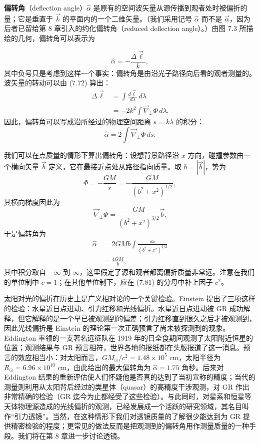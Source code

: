 \textbf{偏转角}（deflection angle）$\widehat{\alpha}$ 是原有的空间波矢量从源传播到观者处时被偏折的量；它是垂直于 $\vec{k}$ 的平面内的一个二维矢量。（我们采用记号 $\widehat{\alpha}$ 而不是 $\vec{\alpha}$，因为后者已留给第 8 章引入的约化偏转角（reduced deflection angle）。）由图 7.3 所描绘的几何，偏转角可以表示为


\begin{equation*}
\widehat{\alpha} = -\frac{\Delta\vec{\ell}}{k},
\tag{7.76}
\end{equation*}
其中负号只是考虑到这样一个事实：偏转角是由沿光子路径向后看的观者测量的。波矢量的转动可以由 (7.72) 算出：
\begin{align*}
\Delta\vec{\ell} &= \int\frac{d\vec{\ell}}{d\lambda}\, d\lambda \\
&= -2k^2\int \vec{\nabla}_{\perp}\Phi\, d\lambda.
\tag{7.77}
\end{align*}
因此，偏转角可以写成沿所经过的物理空间距离 $s = k\lambda$ 的积分：
\begin{equation*}
\boxed{\,\widehat{\alpha} = 2\int \vec{\nabla}_{\perp}\Phi\, ds.\,}
\tag{7.78}
\end{equation*}

我们可以在点质量的情形下算出偏转角：设想背景路径沿 $x$ 方向，碰撞参数由一个横向矢量 $\vec{b}$ 定义，它在最接近点处从路径指向质量。取 $b = |\vec{b}|$，势为
\begin{equation*}
\Phi = -\frac{GM}{r} = -\frac{GM}{(b^2+x^2)^{1/2}},
\tag{7.79}
\end{equation*}
其横向梯度因此为
\begin{equation*}
\vec{\nabla}_{\perp}\Phi = \frac{GM}{(b^2+x^2)^{3/2}}\vec{b}.
\tag{7.80}
\end{equation*}
于是偏转角为
\begin{align*}
\widehat{\alpha} &= 2GMb\int \frac{dx}{(b^2+x^2)^{3/2}} \\
&= \frac{4GM}{b},
\tag{7.81}
\end{align*}
其中积分取自 $-\infty$ 到 $\infty$，这里假定了源和观者都离偏折质量非常远。注意在我们的单位制中 $c = 1$；在其他单位制下，应在 (7.81) 的分母中补上因子 $c^2$。

太阳对光的偏折在历史上是广义相对论的一个关键检验。Einstein 提出了三项这样的检验：水星近日点进动、引力红移和光线偏折。水星近日点进动被 GR 成功解释，但它解释的是一个早已被观测到的偏差；引力红移直到很久之后才被观测到，
因此光线偏折是 Einstein 的理论第一次正确预言了尚未被探测到的现象。Eddington 率领的一支著名远征队在 1919 年的日全食期间观测了太阳附近恒星的位置；观测结果与 GR 预言相符，世界各地的报纸都在头版报道了这一消息。预言的效应相当小：对太阳而言，$GM_\odot/c^2 = 1.48\times10^5$ cm，太阳半径为 $R_\odot = 6.96\times10^{10}$ cm，由此给出的最大偏转角为 $\widehat{\alpha} = 1.75$ 角秒。后来对 Eddington 结果的重新评估使人们怀疑他是否真的达到了当初宣称的精度；当代的测量则利用从太阳背后经过的类星体（quasar）的高精度干涉观测，对 GR 作出非常精确的检验（GR 迄今为止都经受了这些检验）。与此同时，对星系和恒星等天体物理源造成的光线偏折的观测，已经发展成一个活跃的研究领域，其名目叫作“引力透镜”。当然，在这种情形下我们对透镜质量的了解很少能达到为 GR 提供精密检验的程度；更常见的做法反而是把观测到的偏转角用作测量质量的一种手段。我们将在第 8 章进一步讨论透镜。

